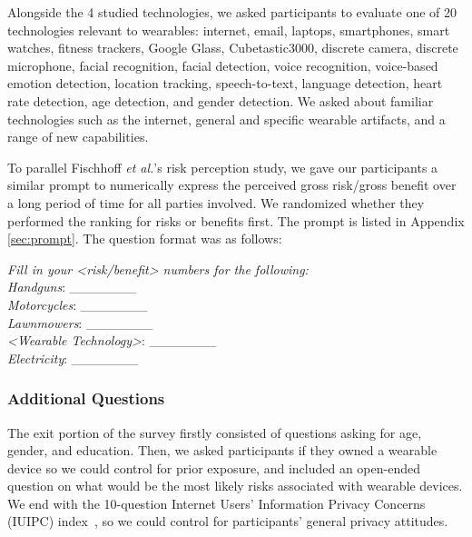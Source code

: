 Alongside the 4 studied technologies, we asked participants to evaluate one of 20 technologies relevant to wearables: internet, email, laptops, smartphones, smart watches, fitness trackers, Google Glass, Cubetastic3000, discrete camera, discrete microphone, facial recognition, facial detection, voice recognition, voice-based emotion detection, location tracking, speech-to-text, language detection, heart rate detection, age detection, and gender detection. We asked about familiar technologies such as the internet, general and specific wearable artifacts, and a range of new capabilities. 


To parallel Fischhoff {\it et al.}'s risk perception study, we gave our participants a similar prompt to numerically express the perceived gross risk/gross benefit over a long period of time for all parties involved. We randomized whether they performed the ranking for risks or benefits first. The prompt is listed in Appendix \ref{sec:prompt}. The question format was as follows:

\textit{Fill in your <risk/benefit> numbers for the following:}\\[-.5cm]

\textit{Handguns}: \_\_\_\_\_\_\_ \\
\textit{Motorcycles}: \_\_\_\_\_\_\_\\
\textit{Lawnmowers}: \_\_\_\_\_\_\_\\
\textit{<Wearable Technology>}: \_\_\_\_\_\_\_\\
\textit{Electricity}: \_\_\_\_\_\_\_\\ [-.5cm]

\subsubsection{Additional Questions}
The exit portion of the survey firstly consisted of questions asking for age, gender, and education. Then, we asked participants if they owned a wearable device so we could control for prior exposure, and included an open-ended question on what would be the most likely risks associated with wearable devices. We end with the 10-question Internet Users' Information Privacy Concerns (IUIPC) index~\cite{malhotra2004internet}, so we could control for participants' general privacy attitudes.

